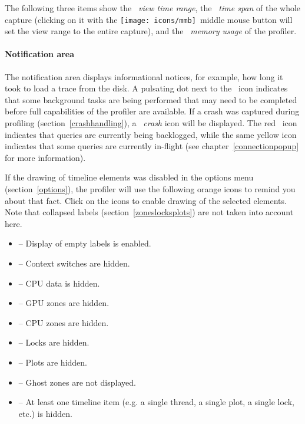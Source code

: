 \documentclass[hidelinks,titlepage,a4paper,twoside]{article}
\newcommand{\MMB}{\texttt{[image: icons/mmb]}}
\begin{document}
The following three items show the \emph{\faEye{}~view time range}, the \emph{\faDatabase{}~time span} of the whole capture (clicking on it with the \MMB{}~middle mouse button will set the view range to the entire capture), and the \emph{\faMemory{}~memory usage} of the profiler.

\paragraph{Notification area}

The notification area displays informational notices, for example, how long it took to load a trace from the disk. A pulsating dot next to the \faTasks~icon indicates that some background tasks are being performed that may need to be completed before full capabilities of the profiler are available. If a crash was captured during profiling (section~\ref{crashhandling}), a \emph{\faSkull{}~crash} icon will be displayed. The red \faSatelliteDish{}~icon indicates that queries are currently being backlogged, while the same yellow icon indicates that some queries are currently in-flight (see chapter~\ref{connectionpopup} for more information).

If the drawing of timeline elements was disabled in the options menu (section~\ref{options}), the profiler will use the following orange icons to remind you about that fact. Click on the icons to enable drawing of the selected elements. Note that collapsed labels (section~\ref{zoneslocksplots}) are not taken into account here.

\begin{itemize}
\item \faExpand{} -- Display of empty labels is enabled.
\item \faHiking{} -- Context switches are hidden.
\item \faSlidersH{} -- CPU data is hidden.
\item \faEye{} -- GPU zones are hidden.
\item \faMicrochip{} -- CPU zones are hidden.
\item \faLock{} -- Locks are hidden.
\item \faSignature{} -- Plots are hidden.
\item \faGhost{} -- Ghost zones are not displayed.
\item \faLowVision{} -- At least one timeline item (e.g. a single thread, a single plot, a single lock, etc.) is hidden.
\end{itemize}
\end{document}

